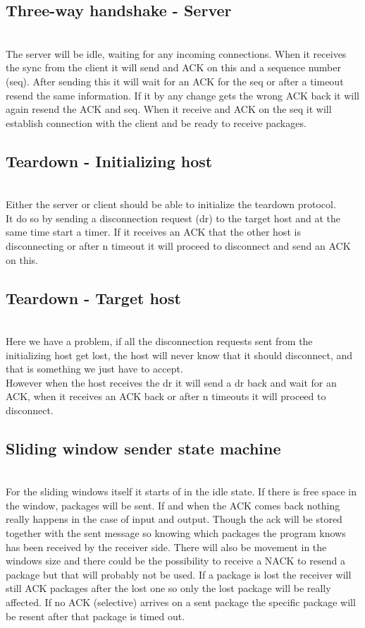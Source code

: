 \documentclass[conference]{IEEEtran}
\begin{document}
\subsection{Three-way handshake - Server}

\\
The server will be idle, waiting for any incoming connections. When it receives the sync from the client it will send and ACK on this and a sequence number (seq). After sending this it will wait for an ACK for the seq or after a timeout resend the same information. If it by any change gets the wrong ACK back it will again resend the ACK and seq. When it receive and ACK on the seq it will establish connection with the client and be ready to receive packages.
\subsection{Teardown - Initializing host}

\\
Either the server or client should be able to initialize the teardown protocol.
\\
It do so by sending a disconnection request (dr) to the target host and at the same time start a timer. If it receives an ACK that the other host is disconnecting or after n timeout it will proceed to disconnect and send an ACK on this. 
\subsection{Teardown - Target host}

\\
Here we have a problem, if all the disconnection requests sent from the initializing host get lost, the host will never know that it should disconnect, and that is something we just have to accept.
\\
However when the host receives the dr it will send a dr back and wait for an ACK, when it receives an ACK back or after n timeouts it will proceed to disconnect. 
\subsection{Sliding window sender state machine}

\\For the sliding windows itself it starts of in the idle state. If there is free space in the window, packages will be sent. If and when the ACK comes back nothing really happens in the case of input and output. Though the ack will be stored together with the sent message so knowing which packages the program knows has been received by the receiver side. There will also be movement in the windows size and there could be the possibility to receive a NACK to resend a package but that will probably not be used. If a package is lost the receiver will still ACK packages after the lost one so only the lost package will be really affected. If no ACK (selective) arrives on a sent package the specific package will be resent after that package is timed out.
\end{document}
